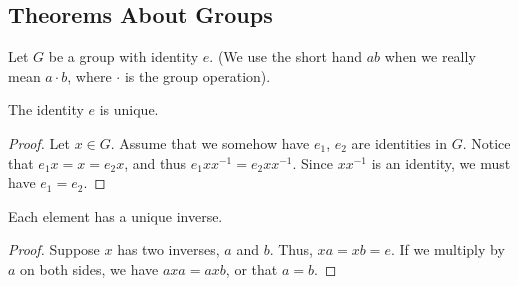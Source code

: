 \label{32-0425}

% 





% 




\subsection{Theorems About Groups}
 
Let $G$ be a group with identity $e$. (We use the short hand $ab$ when we really mean $a \cdot b$, where $\cdot$ is the group operation). 

\begin{theorem}
The identity $e$ is unique.
\end{theorem}
\begin{proof}
Let $x \in G$. Assume that we somehow have $e_1$, $e_2$ are identities in $G$. Notice that $e_1 x = x = e_2 x$, and thus $e_1 x x^{-1} = e_2 x x^{-1}$. Since $x x^{-1}$ is an identity, we must have $e_1 = e_2$. 
\end{proof}

\begin{theorem}
Each element has a unique inverse. 
\end{theorem}
\begin{proof}
Suppose $x$ has two inverses, $a$ and $b$. Thus, $xa = xb = e$. If we multiply by $a$ on both sides, we have $axa = axb$, or that $a = b$. 
\end{proof}

